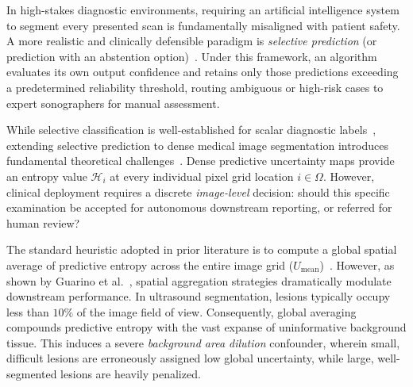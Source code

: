 \documentclass[10pt,journal,compsoc]{IEEEtran}
\begin{document}
In high-stakes diagnostic environments, requiring an artificial intelligence system to segment every presented scan is fundamentally misaligned with patient safety. A more realistic and clinically defensible paradigm is \emph{selective prediction} (or prediction with an abstention option)~\cite{geifman2017selective}. Under this framework, an algorithm evaluates its own output confidence and retains only those predictions exceeding a predetermined reliability threshold, routing ambiguous or high-risk cases to expert sonographers for manual assessment.

While selective classification is well-established for scalar diagnostic labels~\cite{geifman2017selective,devries2018learning}, extending selective prediction to dense medical image segmentation introduces fundamental theoretical challenges~\cite{guarino2026better,roy2019bayesian}. Dense predictive uncertainty maps provide an entropy value $\mathcal{H}_i$ at every individual pixel grid location $i \in \Omega$. However, clinical deployment requires a discrete \emph{image-level} decision: should this specific examination be accepted for autonomous downstream reporting, or referred for human review?

The standard heuristic adopted in prior literature is to compute a global spatial average of predictive entropy across the entire image grid ($U_{\mathrm{mean}}$)~\cite{kendall2017uncertainties}. However, as shown by Guarino et al.~\cite{guarino2026better}, spatial aggregation strategies dramatically modulate downstream performance. In ultrasound segmentation, lesions typically occupy less than $10\%$ of the image field of view. Consequently, global averaging compounds predictive entropy with the vast expanse of uninformative background tissue. This induces a severe \emph{background area dilution} confounder, wherein small, difficult lesions are erroneously assigned low global uncertainty, while large, well-segmented lesions are heavily penalized.
\end{document}
